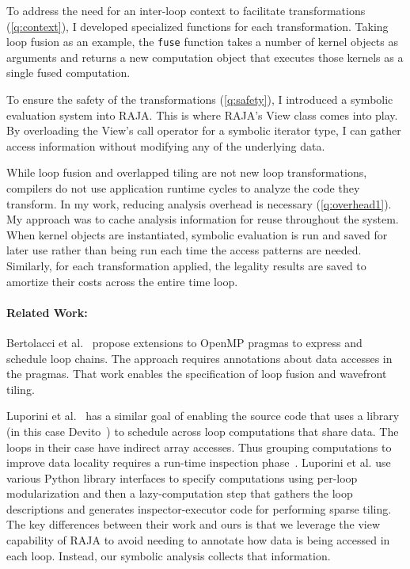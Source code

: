 \documentclass{article}
\begin{document}
To address the need for an inter-loop context to facilitate transformations (\ref{q:context}), I developed specialized functions for each transformation. 
Taking loop fusion as an example, the \verb.fuse. function takes a number of kernel objects as arguments and returns a new computation object that executes those kernels as a single fused computation. 

To ensure the safety of the transformations (\ref{q:safety}), I introduced a symbolic evaluation system into RAJA.
This is where RAJA's View class comes into play. 
By overloading the View's call operator for a symbolic iterator type, I can gather access information without modifying any of the underlying data. 

While loop fusion and overlapped tiling are not new loop transformations, compilers do not use application runtime cycles to analyze the code they transform. 
In my work, reducing analysis overhead is necessary (\ref{q:overhead1}).
My approach was to cache analysis information for reuse throughout the system.
When kernel objects are instantiated, symbolic evaluation is run and saved for later use rather than being run each time the access patterns are needed.
Similarly, for each transformation applied, the legality results are saved to amortize their costs across the entire time loop.

\paragraph{Related Work:}

Bertolacci et al.~\cite{Bertolacci2016,Bertolacci2019} propose extensions to
OpenMP pragmas to express and schedule loop chains.
The approach requires annotations about data accesses in the pragmas.
That work enables the specification of loop fusion and wavefront tiling. 

Luporini et al.~\cite{Luporini2019} has a similar goal of enabling the source
code that uses a library  (in this case Devito~\cite{Luporini2018}) to
schedule across loop computations that share data.
The loops in their case have indirect array accesses.
Thus grouping computations to improve data locality requires a run-time
inspection phase~\cite{Strout14IPDPS}.
Luporini et al. use various Python library interfaces to specify computations
using per-loop modularization and then a lazy-computation step that gathers
the loop descriptions and generates inspector-executor code for performing 
sparse tiling.
The key differences between their work and ours is that we leverage the view 
capability of RAJA to avoid needing to annotate how data is being accessed
in each loop.  
Instead, our symbolic analysis collects that information.
\end{document}
